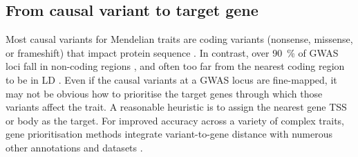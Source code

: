 \begin{outline}
%
%
%
%

\subsection{From causal variant to target gene}

Most causal variants for Mendelian traits are coding variants (nonsense, missense, or frameshift) that impact protein sequence \autocite{chong2015GeneticBasisMendelian}.
In contrast, over \SI{90}{\percent} of \gls{GWAS} loci fall in non-coding regions \autocite{gallagher2018PostGWASEraAssociation},
and often too far from the nearest coding region to be in \gls{LD} \autocite{brodie2016HowFarSNP}.
Even if the causal variants at a \gls{GWAS} locus are fine-mapped, 
it may not be obvious how to prioritise the target genes through which those variants affect the trait.
A reasonable heuristic is to assign the nearest gene \gls{TSS} or body as the target.
For improved accuracy across a variety of complex traits,
gene prioritisation methods integrate variant-to-gene distance with numerous other annotations and datasets \autocite{stacey2019ProGeMFrameworkPrioritization,forgetta2020EffectorIndexPredict,ghoussaini2020OpenTargetsGenetics}.


\end{outline}
